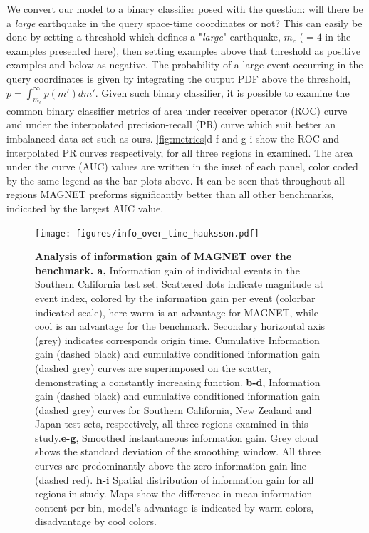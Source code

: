 \documentclass[pdflatex]{sn-jnl}
\begin{document}
We convert our model to a binary classifier posed with the question: will there be a \textit{large} earthquake in the query space-time coordinates or not? This can easily be done by setting a threshold which defines a "\textit{large}" earthquake, $m_c$ ($=4$ in the examples presented here), then setting examples above that threshold as positive examples and below as negative. The probability of a large event occurring in the query coordinates is given by integrating the output PDF above the threshold, $p=\int_{m_c}^{\infty}p(m')dm'$. Given such binary classifier, it is possible to examine the common binary classifier metrics of area under receiver operator (ROC) curve \cite{Murphy} and under the interpolated precision-recall (PR) curve \cite{buttcher_information_2010} which suit better an imbalanced data set such as ours. \ref{fig:metrics}d-f and g-i show the ROC and interpolated PR curves respectively, for all three regions in examined. The area under the curve (AUC) values are written in the inset of each panel, color coded by the same legend as the bar plots above. It can be seen that throughout all regions MAGNET preforms significantly better than all other benchmarks, indicated by the largest AUC value.

   
    
\begin{figure}[h!]
    \centering
    \texttt{[image: figures/info\_over\_time\_hauksson.pdf]}
    \caption{
        \textbf{Analysis of information gain of MAGNET over the benchmark. a,} Information gain of individual events in the Southern California test set. Scattered dots indicate magnitude at event index, colored by the information gain per event (colorbar indicated scale), here warm is an advantage for MAGNET, while cool is an advantage for the benchmark. Secondary horizontal axis (grey) indicates corresponds origin time. Cumulative Information gain (dashed black) and cumulative conditioned information gain (dashed grey) curves are superimposed on the scatter, demonstrating a constantly increasing function. \textbf{b-d}, Information gain (dashed black) and cumulative conditioned information gain (dashed grey) curves for Southern California, New Zealand and Japan test sets, respectively, all three regions examined in this study.\textbf{e-g}, Smoothed instantaneous information gain. Grey cloud shows the standard deviation of the smoothing window. All three curves are predominantly above the zero information gain line (dashed red). \textbf{h-i} Spatial distribution of information gain for all regions in study. Maps show the difference in mean information content per bin, model's advantage is indicated by warm colors, disadvantage by cool colors.
    }
    \label{fig:info_gain_over_time}
\end{figure}
    
\end{document}
